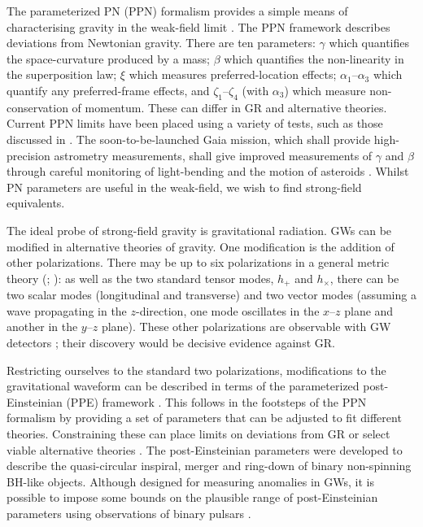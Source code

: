 The parameterized PN (PPN) formalism provides a simple means of characterising gravity in the weak-field limit \citep[chapter 4]{Will1993}. The PPN framework describes deviations from Newtonian gravity. There are ten parameters: $\gamma$ which quantifies the space-curvature produced by a mass; $\beta$ which quantifies the non-linearity in the superposition law; $\xi$ which measures preferred-location effects; $\alpha_1$--$\alpha_3$ which quantify any preferred-frame effects, and $\zeta_1$--$\zeta_4$ (with $\alpha_3$) which measure non-conservation of momentum. These can differ in GR and alternative theories. Current PPN limits have been placed using a variety of tests, such as those discussed in  \citep{Will2006}. The soon-to-be-launched Gaia mission, which shall provide high-precision astrometry measurements, shall give improved measurements of $\gamma$ and $\beta$ through careful monitoring of light-bending and the motion of asteroids \citep{Mignard2010, Hobbs2010a, Hestroffer2010}. Whilst PN parameters are useful in the weak-field, we wish to find strong-field equivalents.

The ideal probe of strong-field gravity is gravitational radiation. GWs can be modified in alternative theories of gravity. One modification is the addition of other polarizations. There may be up to six polarizations in a general metric theory (\citealt{Eardley1973}; \citealt[section 10.2]{Will1993}): as well as the two standard tensor modes, $h_+$ and $h_\times$, there can be two scalar modes (longitudinal and transverse) and two vector modes (assuming a wave propagating in the $z$-direction, one mode oscillates in the $x$--$z$ plane and another in the $y$--$z$ plane). These other polarizations are observable with GW detectors \citep{Tinto2010,Alves2011,Blaut2012}; their discovery would be decisive evidence against GR.

Restricting ourselves to the standard two polarizations, modifications to the gravitational waveform can be described in terms of the parameterized post-Einsteinian (PPE) framework \citep{Yunes2009a}. This follows in the footsteps of the PPN formalism by providing a set of parameters that can be adjusted to fit different theories. Constraining these can place limits on deviations from GR or select viable alternative theories \citep{Cornish2011}. The post-Einsteinian parameters were developed to describe the quasi-circular inspiral, merger and ring-down of binary non-spinning BH-like objects. Although designed for measuring anomalies in GWs, it is possible to impose some bounds on the plausible range of post-Einsteinian parameters using observations of binary pulsars \citep{Yunes2010}.

